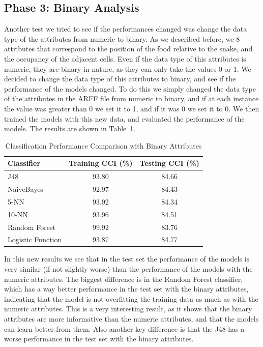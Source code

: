 \documentclass[12pt,a4paper]{article}
\begin{document}
\subsection{Phase 3: Binary Analysis}

Another test we tried to see if the performances changed was change the data type of the attributes from numeric to binary.
As we described before, we 8 attributes that correspond to the position of the food relative to the snake, and the occupancy of the adjacent cells.
Even if the data type of this attributes is numeric, they are binary in nature, as they can only take the values 0 or 1.
We decided to change the data type of this attributes to binary, and see if the performance of the models changed.
To do this we simply changed the data type of the attributes in the ARFF file from numeric to binary, and if at each instance the value was greater than 0 we set it to 1, and if it was 0 we set it to 0.
We then trained the models with this new data, and evaluated the performance of the models.
The results are shown in Table~\ref{tab:binary}.
\begin{table}[ht]
\centering
\caption{Classification Performance Comparison with Binary Attributes}
\label{tab:binary}
\begin{tabular}{lcc}
\hline
\textbf{Classifier} & \textbf{Training CCI (\%)} & \textbf{Testing CCI (\%)} \\ \hline
J48               & 93.80                       & 84.66                     \\
NaiveBayes        & 92.97                       & 84.43                     \\
5-NN              & 93.92                       & 84.34                     \\
10-NN             & 93.96                       & 84.51                     \\
Random Forest     & 99.92                       & 83.76                     \\ 
Logistic Function & 93.87                       & 84.77                     \\\hline
\end{tabular}
\end{table}


In this new results we see that in the test set the performance of the models is very similar (if not slightly worse) than the performance of the models with the numeric attributes.
The biggest difference is in the Random Forest classifier, which has a way better performance in the test set with the binary attributes, 
indicating that the model is not overfitting the training data as much as with the numeric attributes.
This is a very interesting result, as it shows that the binary attributes are more informative than the numeric attributes, and that the models can learn better from them.
Also another key difference is that the J48 has a worse performance in the test set with the binary attributes. 
\end{document}
